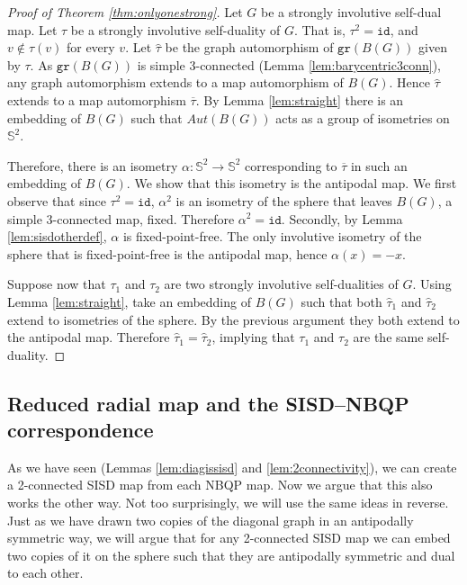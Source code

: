\documentclass{article}
\newcommand{\Sb}[0]{\mathbb{S}}
\newcommand{\gr}{\mathtt{gr}}
\newcommand{\id}{\mathtt{id}}
\begin{document}
\begin{proof}[Proof of Theorem \ref{thm:onlyonestrong}]

Let $G$ be a strongly involutive self-dual map. Let $\tau$ be a strongly involutive self-duality of $G$. That is, $\tau^2=\id$, and $v\notin\tau(v)$ for every $v$. Let $\widehat{\tau}$ be the graph automorphism of $\gr(B(G))$ given by $\tau$. As $\gr(B(G))$ is simple 3-connected (Lemma \ref{lem:barycentric3conn}), any graph automorphism extends to a map automorphism of $B(G)$. Hence $\widehat{\tau}$ extends to a map automorphism $\overline{\tau}$. By Lemma \ref{lem:straight} there is an embedding of $B(G)$ such that $Aut(B(G))$ acts as a group of isometries on $\Sb^2$.

Therefore, there is an isometry $\alpha: \Sb^2\rightarrow \Sb^2$ corresponding to $\overline{\tau}$ in such an embedding of $B(G)$. We show that this isometry is  the antipodal map.  We first observe that since $\tau^2=\id$, $\alpha^2$ is an isometry of the sphere that leaves $B(G)$, a simple 3-connected map, fixed. Therefore $\alpha^2=\id$. Secondly, by Lemma \ref{lem:sisdotherdef}, $\alpha$ is fixed-point-free. The only involutive isometry of the sphere that is fixed-point-free is the antipodal map, hence $\alpha(x)=-x$.

Suppose now that $\tau_1$ and $\tau_2$ are two strongly involutive self-dualities of $G$. Using Lemma \ref{lem:straight}, take an embedding of $B(G)$ such that both $\widehat{\tau}_1$ and $\widehat{\tau}_2$ extend to isometries of the sphere. By the previous argument they both extend to the antipodal map. Therefore $\widehat{\tau}_1=\widehat{\tau}_2$, implying that $\tau_1$ and $\tau_2$  are the same self-duality.


\end{proof}



\subsection{Reduced radial map and the SISD--NBQP correspondence}




As we have seen (Lemmas \ref{lem:diagissisd} and \ref{lem:2connectivity}), we can create a 2-connected SISD map from each NBQP map. Now we argue that this also works the other way. Not too surprisingly, we will use the same ideas in reverse. Just as we have drawn two copies of the diagonal graph in an antipodally symmetric way, we will argue that for any 2-connected SISD map we can embed two copies of it on the sphere such that they are antipodally symmetric and dual to each other. 
\end{document}
